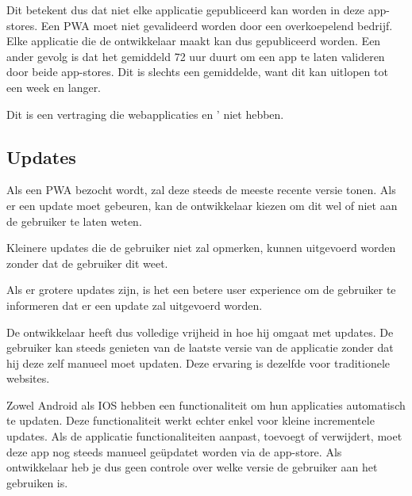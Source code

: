 	Dit betekent dus dat niet elke applicatie gepubliceerd kan worden in deze app-stores. Een PWA moet niet gevalideerd worden door een overkoepelend bedrijf. Elke applicatie die de ontwikkelaar maakt kan dus gepubliceerd worden.
	Een ander gevolg is dat het gemiddeld 72 uur duurt om een app te laten valideren door beide app-stores. Dit is slechts een gemiddelde, want dit kan uitlopen tot een week en langer.
	\autocite{Siddiqui2019}
	
	Dit is een vertraging die webapplicaties en ' niet hebben.
	
\subsection{Updates}

	Als een PWA bezocht wordt, zal deze steeds de meeste recente versie tonen. Als er een update moet gebeuren, kan de ontwikkelaar kiezen om dit wel of niet aan de gebruiker te laten weten. 	
	\autocite{Hume2018}
	
	Kleinere updates die de gebruiker niet zal opmerken, kunnen uitgevoerd worden zonder dat de gebruiker dit weet.
	 \autocite{Sanderson2020}
	 
	Als er grotere updates zijn, is het een betere user experience om de gebruiker te informeren dat er een update zal uitgevoerd worden.
	\autocite{Wicki2017}
	 
	De ontwikkelaar heeft dus volledige vrijheid in hoe hij omgaat met updates. De gebruiker kan steeds genieten van de laatste versie van de applicatie zonder dat hij deze zelf manueel moet updaten. Deze ervaring is dezelfde voor traditionele websites.
	
	Zowel Android als IOS hebben een functionaliteit om hun applicaties automatisch te updaten. Deze functionaliteit werkt echter enkel voor kleine incrementele updates. Als de applicatie functionaliteiten aanpast, toevoegt of verwijdert, moet deze app nog steeds manueel geüpdatet worden via de app-store. Als ontwikkelaar heb je dus geen controle over welke versie de gebruiker aan het gebruiken is.
	\autocite{Apple2020d}
	\autocite{AndroidDevelopers2020}
		

